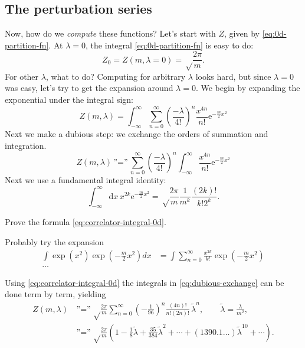 \documentclass[12pt,letterpaper,reqno]{article}
\numberwithin{equation}{section}
\newcommand{\e}{{\mathrm e}}
\newcommand{\de}{\mathrm{d}}
\newcommand{\tlambda}{\widetilde\lambda}
\newcommand{\ti}[1]{\textit{#1}}
\begin{document}
\subsection{The perturbation series}

Now, how do we \ti{compute} these functions? Let's start with $Z$, given by \eqref{eq:0d-partition-fn}.
At $\lambda = 0$, the integral \eqref{eq:0d-partition-fn}
is easy to do:
\begin{equation} \label{eq:0d-Z0}
  Z_0 = Z(m, \lambda = 0) = \sqrt\frac{2\pi}{m}.
\end{equation}
For other $\lambda$, what to do? Computing for arbitrary $\lambda$ looks hard, but since $\lambda = 0$ was
easy, let's try to get the expansion around $\lambda = 0$. 
We begin by expanding the exponential under the integral sign:
\begin{equation}
  Z(m, \lambda) = \int_{-\infty}^\infty \sum_{n=0}^\infty \left( \frac{-\lambda}{4!} \right)^n \frac{x^{4n}}{n!} \e^{-\frac{m}{2} x^2}
\end{equation}
Next we make a dubious step: we exchange the orders of summation and integration.
\begin{equation} \label{eq:dubious-exchange}
  Z(m, \lambda) \, \text{''=''} \, \sum_{n=0}^\infty \left( \frac{-\lambda}{4!} \right)^n \int_{-\infty}^\infty \frac{x^{4n}}{n!} \e^{-\frac{m}{2} x^2}
\end{equation}
Next we use a fundamental integral identity:
\begin{equation} \label{eq:correlator-integral-0d}
  \int_{-\infty}^\infty \de x\,x^{2k} \e^{-\frac{m}{2}x^2}  = \sqrt\frac{2\pi}{m} \frac{1}{m^k} \frac{(2k)!}{k!2^k}.
\end{equation}
\begin{exercise} Prove the formula \eqref{eq:correlator-integral-0d}.
\end{exercise}
\begin{solution}
  Probably try the expansion
  \begin{equation}
    \begin{split}
    \int \exp\left(x^2\right)\exp\left(-\frac{m}{2}x^2\right)dx&=\int \sum_{n=0}^{\infty}\frac{x^{2k}}{k!}\exp\left(-\frac{m}{2}x^2\right)\\
\ldots
    \end{split}
  \end{equation}
\end{solution}
Using \eqref{eq:correlator-integral-0d} the integrals in \eqref{eq:dubious-exchange} can be done term by term, yielding
\begin{align} \label{eq:0d-perturbation-series}
  Z(m, \lambda) \, &\text{''=''} \, \sqrt\frac{2\pi}{m} \sum_{n=0}^\infty \left( - \frac{1}{96} \right)^n \frac{(4n)!}{n!(2n)!} \, \tlambda^n, \qquad \tlambda = \frac{\lambda}{m^2}, \\
  &\text{''=''} \, \sqrt\frac{2\pi}{m} \left(1 - \frac18 \tlambda + \frac{35}{384} \tlambda^2 + \cdots + (1390.1 \dots) \tlambda^{10} + \cdots \right).
\end{align}
\end{document}

